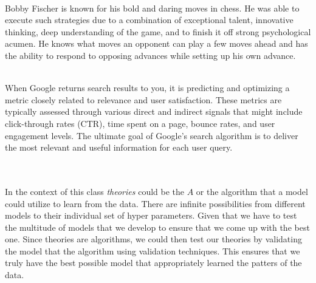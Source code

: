 \documentclass[12pt]{article}
\begin{document}
\begin{enumerate}
\\ 
Bobby Fischer is known for his bold and daring moves in chess. He was able to execute such strategies due to a combination of exceptional talent, innovative thinking, deep understanding of the game, and to finish it off strong psychological acumen. He knows what moves an opponent can play a few moves ahead and has the ability to respond to opposing advances while setting up his own advance. 

 \\ 
When Google returns search results to you, it is predicting and optimizing a metric closely related to relevance and user satisfaction. These metrics are typically assessed through various direct and indirect signals that might include click-through rates (CTR), time spent on a page, bounce rates, and user engagement levels. The ultimate goal of Google's search algorithm is to deliver the most relevant and useful information for each user query.

 \\ \\ 
In the context of this class \textit{theories} could be the \(A\) or the algorithm that a model could utilize to learn from the data. There are infinite possibilities from different models to their individual set of hyper parameters.  Given that we have to test the multitude of models that we develop to ensure that we come up with the best one. Since theories are algorithms, we could then test our theories by validating the model that the algorithm using validation techniques. This ensures that we truly have the best possible model that appropriately learned the patters of the data. 


\end{enumerate}
\end{document}
